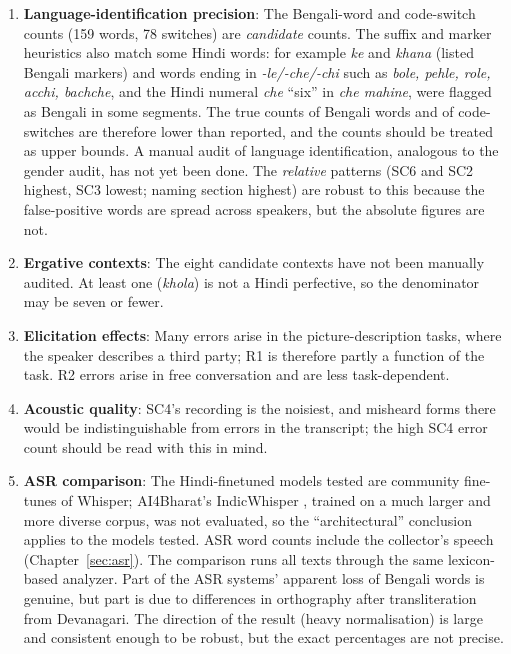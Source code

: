 \documentclass[11pt,a4paper]{report}
\begin{document}
\begin{enumerate}
  \item \textbf{Language-identification precision}: The Bengali-word and code-switch counts (159 words, 78 switches) are \emph{candidate} counts. The suffix and marker heuristics also match some Hindi words: for example \textit{ke} and \textit{khana} (listed Bengali markers) and words ending in \textit{-le/-che/-chi} such as \textit{bole, pehle, role, acchi, bachche}, and the Hindi numeral \textit{che} ``six'' in \textit{che mahine}, were flagged as Bengali in some segments. The true counts of Bengali words and of code-switches are therefore lower than reported, and the counts should be treated as upper bounds. A manual audit of language identification, analogous to the gender audit, has not yet been done. The \emph{relative} patterns (SC6 and SC2 highest, SC3 lowest; naming section highest) are robust to this because the false-positive words are spread across speakers, but the absolute figures are not.
  \item \textbf{Ergative contexts}: The eight candidate contexts have not been manually audited. At least one (\textit{khola}) is not a Hindi perfective, so the denominator may be seven or fewer.
  \item \textbf{Elicitation effects}: Many errors arise in the picture-description tasks, where the speaker describes a third party; R1 is therefore partly a function of the task. R2 errors arise in free conversation and are less task-dependent.
  \item \textbf{Acoustic quality}: SC4's recording is the noisiest, and misheard forms there would be indistinguishable from errors in the transcript; the high SC4 error count should be read with this in mind.
  \item \textbf{ASR comparison}: The Hindi-finetuned models tested are community fine-tunes of Whisper; AI4Bharat's IndicWhisper \citep{bhogale2023vistaar}, trained on a much larger and more diverse corpus, was not evaluated, so the ``architectural'' conclusion applies to the models tested. ASR word counts include the collector's speech (Chapter~\ref{sec:asr}). The comparison runs all texts through the same lexicon-based analyzer. Part of the ASR systems' apparent loss of Bengali words is genuine, but part is due to differences in orthography after transliteration from Devanagari. The direction of the result (heavy normalisation) is large and consistent enough to be robust, but the exact percentages are not precise.
\end{enumerate}

\end{document}
